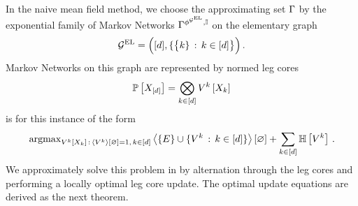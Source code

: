 
In the naive mean field method, we choose the approximating set $\Gamma$ by the exponential family of Markov Networks $\Gamma^{\phi^{\mathcal{G}^{\mathrm{EL}}},\mathbb{I}}$ on the elementary graph %
\begin{align*}
    \mathcal{G}^{\mathrm{EL}}=\Big([d],\{\big\{k\}\, : \, k\in[d]\big\}\Big) \, .
\end{align*}
Markov Networks on this graph are represented by normed leg cores
\begin{align*}
    \mathbb{P}\left[X_{[d]}\right]
    = \bigotimes_{k\in[d]} V^{k}\left[X_{k}\right]
\end{align*}
 is for this instance of the form
\begin{align*}
    \mathrm{argmax}_{V^{k}\left[X_{k}\right] \, : \, \left\langle V^{k}\right\rangle \left[ \varnothing \right]=1,\, k\in[d]}
    \left\langle \{E\} \cup \{V^{k} \, : \, k\in[d]\}\right\rangle \left[ \varnothing \right]
    + \sum_{k\in[d]} \mathbb{H}\left[V^{k}\right] \, .
\end{align*}
We approximately solve this problem in  by alternation through the leg cores and performing a locally optimal leg core update.
The optimal update equations are derived as the next theorem.

